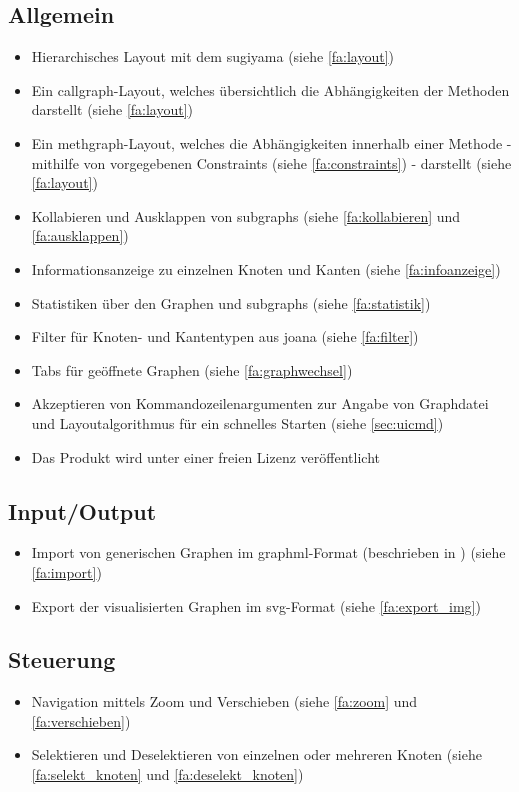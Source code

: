 \subsection{Allgemein}
  \begin{itemize}
    \item Hierarchisches Layout mit dem \gls{sugiyama} (siehe \ref{fa:layout})
    \item Ein \gls{callgraph}-Layout, welches übersichtlich die Abhängigkeiten der Methoden darstellt (siehe \ref{fa:layout})
    \item Ein \gls{methgraph}-Layout, welches die Abhängigkeiten innerhalb einer Methode - mithilfe von vorgegebenen Constraints (siehe \ref{fa:constraints}) - darstellt (siehe \ref{fa:layout})
    \item Kollabieren und Ausklappen von \glspl{subgraph} (siehe \ref{fa:kollabieren} und \ref{fa:ausklappen})
    \item Informationsanzeige zu einzelnen Knoten und Kanten (siehe \ref{fa:infoanzeige})
    \item Statistiken über den Graphen und \glspl{subgraph} (siehe \ref{fa:statistik})
    \item Filter für Knoten- und Kantentypen aus \gls{joana} (siehe \ref{fa:filter})
    \item Tabs für geöffnete Graphen (siehe \ref{fa:graphwechsel})
    \item Akzeptieren von Kommandozeilenargumenten zur Angabe von Graphdatei und Layoutalgorithmus für ein schnelles Starten (siehe \autoref{sec:uicmd})
    \item Das Produkt wird unter einer freien Lizenz veröffentlicht
  \end{itemize}

\subsection{Input/Output}
  \begin{itemize}
    \item Import von generischen Graphen im \gls{graphml}-Format (beschrieben in ) (siehe \ref{fa:import})
    \item Export der visualisierten Graphen im \gls{svg}-Format (siehe \ref{fa:export_img})
  \end{itemize}

\subsection{Steuerung}
  \begin{itemize}
    \item Navigation mittels Zoom und Verschieben (siehe \ref{fa:zoom} und \ref{fa:verschieben})
    \item Selektieren und Deselektieren von einzelnen oder mehreren Knoten (siehe \ref{fa:selekt_knoten} und \ref{fa:deselekt_knoten})
  \end{itemize}

